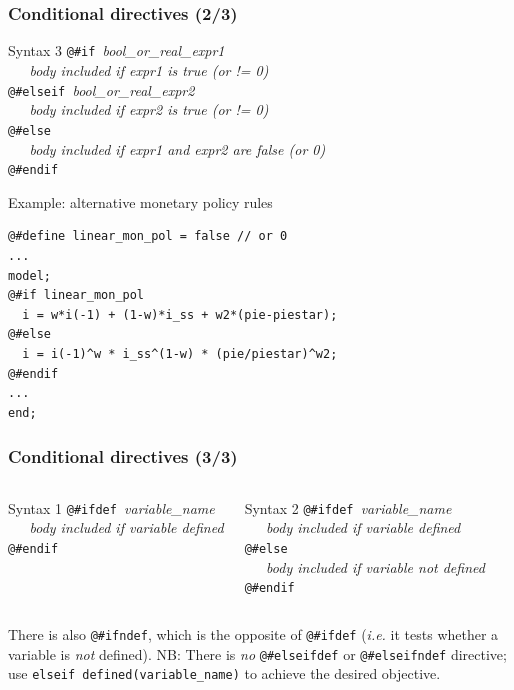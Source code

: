 \documentclass{beamer}
\begin{document}
\begin{frame}[fragile=singleslide]
  \frametitle{Conditional directives (2/3)}
  \begin{block}{Syntax 3}
    \verb+@#if +\textit{bool\_or\_real\_expr1} \\
    \verb+   +\textit{body included if expr1 is true (or != 0)} \\
    \verb+@#elseif +\textit{bool\_or\_real\_expr2} \\
    \verb+   +\textit{body included if expr2 is true (or != 0)} \\
    \verb+@#else+ \\
    \verb+   +\textit{body included if expr1 and expr2 are false (or 0)} \\
    \verb+@#endif+
  \end{block}

  \begin{block}{Example: alternative monetary policy rules}
    \scriptsize
\begin{verbatim}
@#define linear_mon_pol = false // or 0
...
model;
@#if linear_mon_pol
  i = w*i(-1) + (1-w)*i_ss + w2*(pie-piestar);
@#else
  i = i(-1)^w * i_ss^(1-w) * (pie/piestar)^w2;
@#endif
...
end;
\end{verbatim}
    \scriptsize
  \end{block}
\end{frame}

\begin{frame}[fragile=singleslide]
  \frametitle{Conditional directives (3/3)}

  \begin{columns}[T]
    \begin{block}{Syntax 1}
\verb+@#ifdef +\textit{variable\_name} \\
\verb+   +\textit{body included if variable defined} \\
\verb+@#endif+
    \end{block}

    \begin{block}{Syntax 2}
\verb+@#ifdef +\textit{variable\_name} \\
\verb+   +\textit{body included if variable defined} \\
\verb+@#else+ \\
\verb+   +\textit{body included if variable not defined} \\
\verb+@#endif+
    \end{block}
  \end{columns}

\bigskip

There is also \verb+@#ifndef+, which is the opposite of \verb+@#ifdef+
(\textit{i.e.} it tests whether a variable is \emph{not} defined). NB: There is
\emph{no} \verb+@#elseifdef+ or \verb+@#elseifndef+ directive; use
\verb+elseif defined(variable_name)+ to achieve the desired objective.
\end{frame}
\end{document}
